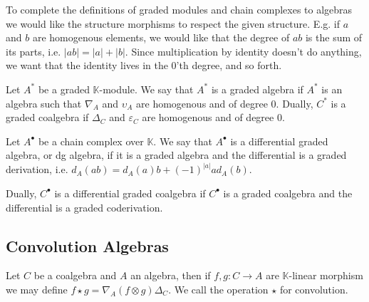 \documentclass[../thesis.tex]{subfiles}
\begin{document}
            To complete the definitions of graded modules and chain complexes to algebras we would like the structure morphisms to respect the given structure. E.g. if $a$ and $b$ are homogenous elements, we would like that the degree of $ab$ is the sum of its parts, i.e. $|ab| = |a| + |b|$. Since multiplication by identity doesn't do anything, we want that the identity lives in the $0$'th degree, and so forth.

            \begin{definition}
                Let $A^*$ be a graded $\mathbb{K}$-module. We say that $A^*$ is a graded algebra if $A^*$ is an algebra such that $\nabla_A$ and $\upsilon_A$ are homogenous and of degree $0$.
                Dually, $C^*$ is a graded coalgebra if $\Delta_C$ and $\varepsilon_C$ are homogenous and of degree $0$.
            \end{definition}

            \begin{definition}
                Let $A^{\bullet}$ be a chain complex over $\mathbb{K}$. We say that $A^{\bullet}$ is a differential graded algebra, or dg algebra, if it is a graded algebra and the differential is a graded derivation, i.e. $d_A(ab) = d_A(a)b + (-1)^{|a|}ad_A(b)$.

                Dually, $C^{\bullet}$ is a differential graded coalgebra if $C^{\bullet}$ is a graded coalgebra and the differential is a graded coderivation.
            \end{definition}

        \subsection{Convolution Algebras}

            Let $C$ be a coalgebra and $A$ an algebra, then if $f,g:C\rightarrow A$ are $\mathbb{K}$-linear morphism we may define $f\star g = \nabla_A(f\otimes g)\Delta_C$. We call the operation $\star$ for convolution.

            \begin{center}
            \end{center}
\end{document}
